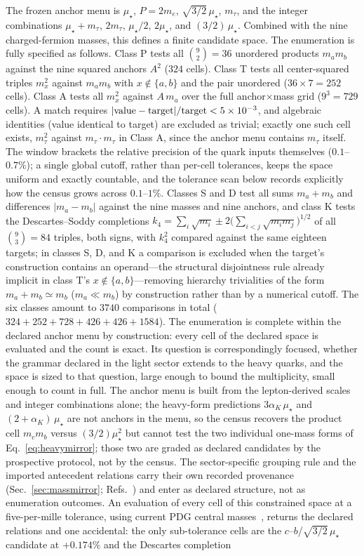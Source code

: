 \documentclass[aps,twocolumn,superscriptaddress,nofootinbib,floatfix]{revtex4-2}
\newcommand{\mstar}{\mu_\star}
\newcommand{\alphaK}{\alpha_K}
\begin{document}
The frozen anchor menu is $\mstar$, $P=2m_e$, $\sqrt{3/2}\,\mstar$, $m_\tau$, and the integer combinations $\mstar+m_\tau$, $2m_\tau$, $\mstar/2$, $2\mstar$, and $(3/2)\,\mstar$. Combined with the nine charged-fermion masses, this defines a finite candidate space. The enumeration is fully specified as follows. Class P tests all $\binom{9}{2}=36$ unordered products $m_am_b$ against the nine squared anchors $A^2$ ($324$ cells). Class T tests all center-squared triples $m_x^2$ against $m_am_b$ with $x\notin\{a,b\}$ and the pair unordered ($36\times7=252$ cells). Class A tests all $m_x^2$ against $A\,m_a$ over the full anchor$\times$mass grid ($9^3=729$ cells). A match requires $|{\rm value}-{\rm target}|/{\rm target}<5\times10^{-3}$, and algebraic identities (value identical to target) are excluded as trivial; exactly one such cell exists, $m_\tau^2$ against $m_\tau\cdot m_\tau$ in Class A, since the anchor menu contains $m_\tau$ itself. The window brackets the relative precision of the quark inputs themselves ($0.1$--$0.7\%$); a single global cutoff, rather than per-cell tolerances, keeps the space uniform and exactly countable, and the tolerance scan below records explicitly how the census grows across $0.1$--$1\%$. Classes S and D test all sums $m_a+m_b$ and differences $|m_a-m_b|$ against the nine masses and nine anchors, and class K tests the Descartes--Soddy completions $k_4=\sum_i\sqrt{m_i}\pm2\bigl(\sum_{i<j}\sqrt{m_im_j}\bigr)^{1/2}$ of all $\binom{9}{3}=84$ triples, both signs, with $k_4^2$ compared against the same eighteen targets; in classes S, D, and K a comparison is excluded when the target's construction contains an operand---the structural disjointness rule already implicit in class T's $x\notin\{a,b\}$---removing hierarchy trivialities of the form $m_a+m_b\simeq m_b$ ($m_a\ll m_b$) by construction rather than by a numerical cutoff. The six classes amount to $3740$ comparisons in total ($324+252+728+426+426+1584$). The enumeration is complete within the declared anchor menu by construction: every cell of the declared space is evaluated and the count is exact. Its question is correspondingly focused, whether the grammar declared in the light sector extends to the heavy quarks, and the space is sized to that question, large enough to bound the multiplicity, small enough to count in full. The anchor menu is built from the lepton-derived scales and integer combinations alone; the heavy-form predictions $3\alphaK\,\mstar$ and $(2+\alphaK)\,\mstar$ are not anchors in the menu, so the census recovers the product cell $m_cm_b$ versus $(3/2)\mstar^2$ but cannot test the two individual one-mass forms of Eq.~\eqref{eq:heavymirror}; those two are graded as declared candidates by the prospective protocol, not by the census. The sector-specific grouping rule and the imported antecedent relations carry their own recorded provenance (Sec.~\ref{sec:massmirror}; Refs.~\cite{BrilliantAPPB,BrilliantMPLA}) and enter as declared structure, not as enumeration outcomes. An evaluation of every cell of this constrained space at a five-per-mille tolerance, using current PDG central masses~\cite{PDG2026}, returns the declared relations and one accidental: the only sub-tolerance cells are the $c$--$b$/$\sqrt{3/2}\,\mstar$ candidate at $+0.174\%$ and the Descartes completion 
\end{document}
